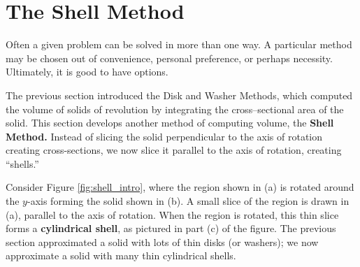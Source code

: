 \section{The Shell Method}\label{sec:shell_method}

Often a given problem can be solved in more than one way. A particular method may be chosen out of convenience, personal preference, or perhaps necessity. Ultimately, it is good to have options.

The previous section introduced the Disk and Washer Methods, which computed the volume of solids of revolution by integrating the cross--sectional area of the solid. This section develops another method of computing volume, the \textbf{Shell Method.} Instead of slicing the solid perpendicular to the axis of rotation creating cross-sections, we now slice it parallel to the axis of rotation, creating ``shells.''

Consider Figure \ref{fig:shell_intro}, where the region shown in (a) is rotated around the $y$-axis forming the solid shown in (b). A small slice of the region is drawn in (a), parallel to the axis of rotation. When the region is rotated, this thin slice forms a \textbf{cylindrical shell}, as pictured in part (c) of the figure. The previous section approximated a solid with lots of thin disks (or washers); we now approximate a solid with many thin cylindrical shells. 

